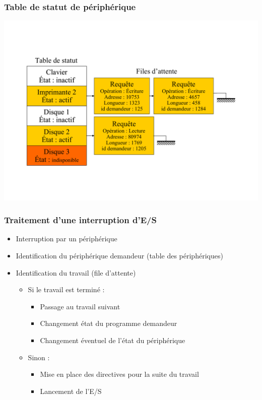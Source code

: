 \begin{frame}
\frametitle{Table de statut de périphérique}
\includegraphics[width=\textwidth]{../illustration/table_statut.pdf}
\end{frame}


\begin{frame}
\frametitle{Traitement d’une interruption d’E/S}
\begin{itemize}
\item Interruption par un périphérique
\item Identification du périphérique demandeur (table des périphériques)
\item Identification du travail (file d’attente)
\begin{itemize}
\item Si le travail est terminé :
\begin{itemize}
\item Passage au travail suivant
\item Changement état du programme demandeur
\item Changement éventuel de l’état du périphérique
\end{itemize}
\item Sinon :
\begin{itemize}
\item Mise en place des directives pour la suite du travail
\item Lancement de l'E/S
\end{itemize}
\end{itemize}
\end{itemize}
\end{frame}


